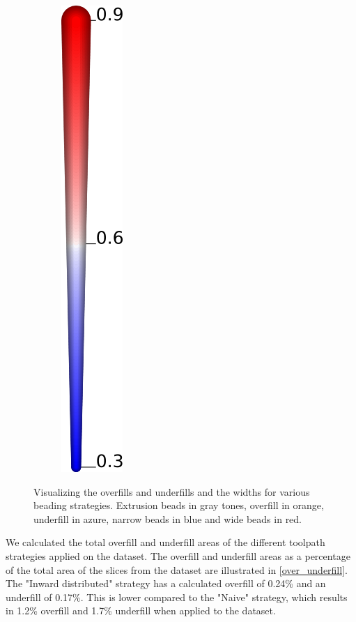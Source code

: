 \begin{figure}
\begin{subfigure}{.04\columnwidth}
\includegraphics[height=\figheight]{sources/validation/gMAT_example/widths_legend.png}
\end{subfigure}
\caption{
Visualizing the overfills and underfills and the widths for various beading strategies.
Extrusion beads in gray tones,
overfill in orange,
underfill in azure,
narrow beads in blue
and wide beads in red.
}
\label{visualized_accuracy}
\end{figure}


We calculated the total overfill and underfill areas of the different toolpath strategies applied on the dataset. 
The overfill and underfill areas as a percentage of the total area of the slices from the dataset are illustrated in \cref{over_underfill}.  
The "Inward distributed" strategy has a calculated overfill of 0.24\% and an underfill of 0.17\%.
This is lower compared to the "Naive" strategy, which results in 1.2\% overfill and 1.7\% underfill when applied to the dataset.

